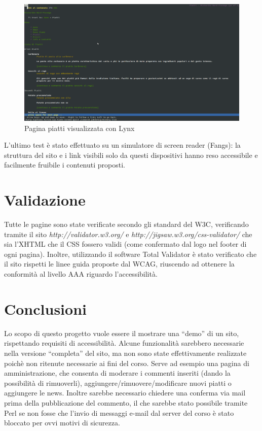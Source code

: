 \documentclass[10pt,a4paper,onecolumn]{article}
\begin{document}
\begin{figure}[h]
\centering
\includegraphics[scale=0.20]{piattiLynx}
\caption{Pagina piatti visualizzata con Lynx}
\label{piattiLynx}
\end{figure}

L'ultimo test è stato effettuato su un simulatore di screen reader (Fangs): la struttura del sito e i link visibili solo da questi dispositivi hanno reso accessibile e facilmente fruibile i contenuti proposti.

\section{Validazione}

Tutte le pagine sono state verificate secondo gli standard del W3C, verificando tramite il sito \textit{http://validator.w3.org/} e \textit{http://jigsaw.w3.org/css-validator/} che sia l’XHTML che il CSS fossero validi (come confermato dal logo nel footer di ogni pagina).
Inoltre, utilizzando il software Total Validator è stato verificato che il sito rispetti le linee guida proposte dal WCAG, riuscendo ad ottenere la conformità al livello AAA riguardo l’accessibilità.

\section{Conclusioni}

Lo scopo di questo progetto vuole essere il mostrare una ``demo'' di un sito, rispettando requisiti di accessibilità. Alcune funzionalità sarebbero necessarie nella versione “completa” del sito, ma non sono state effettivamente realizzate poichè non ritenute necessarie ai  fini del corso.
Serve ad esempio una pagina di amministrazione, che consenta di moderare i commenti inseriti (dando la possibilità di rimuoverli), aggiungere/rimuovere/modificare nuovi piatti o aggiungere le news. Inoltre sarebbe necessario chiedere una conferma via mail prima della pubblicazione del commento, il che sarebbe stato possibile tramite Perl se non fosse che l’invio di messaggi e-mail dal server del corso è stato bloccato per ovvi motivi di sicurezza.
\end{document}
